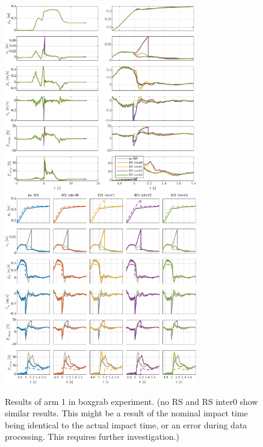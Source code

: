 \documentclass[11pt]{report}
\numberwithin{equation}{section}        %
\numberwithin{figure}{section}          %
\numberwithin{table}{section}           %
\begin{document}
\begin{figure}[]
  \centering
  \begin{adjustwidth}{0pt}{5pt}
  \centering
  \includegraphics[width=0.75\textwidth]{Graphics/Boxgrab result in y-direction of arm 1_z_1.pdf}\\
    \includegraphics[width=0.75\textwidth]{Graphics/Boxgrab result in y-direction of arm 1_z_2.pdf}
  \end{adjustwidth}
  \caption{Results of arm 1 in boxgrab experiment. (no RS and RS inter0 show similar results. This might be a result of the nominal impact time being identical to the actual impact time, or an error during data processing. This requires further investigation.)}
  \label{fig:grab1}
  \end{figure}
\end{document}
